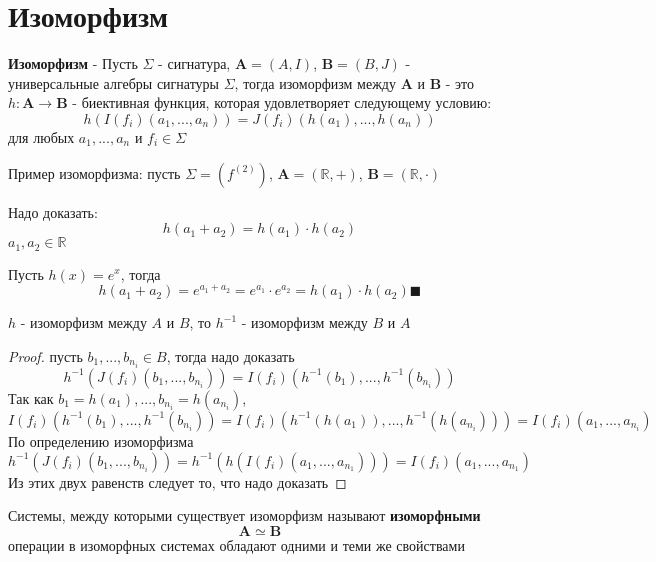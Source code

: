 \documentclass[../main/document.tex]{subfiles}
\begin{document}
\section{Изоморфизм}
\begin{dfn}
\textbf{Изоморфизм} - Пусть $\Sigma$ - сигнатура, $\mathbf{A}=(A,I)$, $\mathbf{B}=(B,J)$ - \\
 универсальные алгебры сигнатуры $\Sigma$, тогда изоморфизм между $\mathbf{A}$ и $\mathbf{B}$ - это $h:\mathbf{A}\rightarrow \mathbf{B}$ - биективная функция, которая удовлетворяет следующему условию:
$$h(I(f_i)(a_1,...,a_n))=J(f_i)(h(a_1),...,h(a_n))$$
для любых $a_1,...,a_n$ и $f_i\in \Sigma$
\end{dfn}

\begin{exm}
Пример изоморфизма: пусть $\Sigma=(f^{(2)})$, $\mathbf{A}=(\mathbb{R},+)$, $\mathbf{B}=(\mathbb{R},\cdot)$

Надо доказать: 
$$h(a_1+a_2)=h(a_1)\cdot h(a_2)$$
$a_1,a_2\in \mathbb{R}$

Пусть $h(x)=e^x$, тогда
$$h(a_1+a_2)=e^{a_1+a_2}=e^{a_1}\cdot e^{a_2}=h(a_1)\cdot h(a_2)\blacksquare$$
\end{exm}

\begin{thm}\label{isomorphism-inverse}
$h$ - изоморфизм между $A$ и $B$, то $h^{-1}$ - изоморфизм между $B$ и $A$
\begin{proof} пусть $b_1,...,b_{n_i}\in B$, тогда надо доказать
$$h^{-1}(J(f_i)(b_1,...,b_{n_i}))=I(f_i)(h^{-1}(b_1),...,h^{-1}(b_{n_i}))$$
Так как $b_1=h(a_1),...,b_{n_i}=h(a_{n_i})$,
$$I(f_i)(h^{-1}(b_1),...,h^{-1}(b_{n_i}))=I(f_i)(h^{-1}(h(a_1)),...,h^{-1}(h(a_{n_i})))=I(f_i)(a_1,...,a_{n_i})$$
По определению изоморфизма
$$h^{-1}(J(f_i)(b_1,...,b_{n_i}))=h^{-1}(h(I(f_i)(a_1,...,a_{n_1})))=I(f_i)(a_1,...,a_{n_1})$$
Из этих двух равенств следует то, что надо доказать
\end{proof}
\end{thm}

\begin{dfn}
Системы, между которыми существует изоморфизм называют \textbf{изоморфными}
$$\mathbf{A}\simeq\mathbf{B}$$
операции в изоморфных системах обладают одними и теми же свойствами
\end{dfn}
\end{document}
